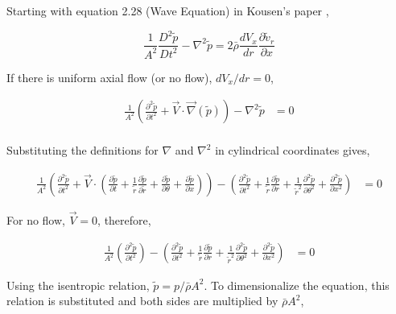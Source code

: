 \documentclass[a4paper]{article}
\begin{document}
Starting with equation 2.28 (Wave Equation) in Kousen's paper \cite{Kousen1999},



\begin{equation}
    \frac{1}{A^2}\frac{D^2\tilde{p}}{Dt^2} -
    \nabla^2 \tilde{p} =
    2 \bar{\rho} \frac{d V_x}{d r} \frac{\partial  \tilde{v}_r}{ \partial x} 
    \label{eqn:KousensWaveEquation}
\end{equation}

If there is uniform axial flow (or no flow), $dV_x/dr = 0$,

\begin{align*}
    \frac{1}{A^2}\left(
        \frac{\partial^2 \tilde{p}}{\partial t^2} + 
        \vec{V}\cdot \vec {\nabla} (\tilde{p}) 
    \right) -
    \nabla^2
    \tilde{p} &=
    0 \\
\end{align*}

Substituting the definitions for $\nabla$ and $\nabla^2$ in cylindrical 
coordinates gives,

\begin{align*} 
    \frac{1}{A^2}\left(
        \frac{\partial^2 \tilde{p}}{\partial t^2}
    + 
        \vec{V}\cdot \left(
            \frac{\partial\tilde{p}}{\partial t} + 
            \frac{1}{\tilde{r}}\frac{\partial \tilde{p} }{\partial \tilde{r}} +
            \frac{\partial \tilde{p}}{\partial \theta} +
            \frac{\partial \tilde{p}}{\partial x}  
        \right)  \right)-
        \left(
            \frac{\partial^2 \tilde{p}}{\partial t^2} + 
            \frac{1}{\tilde{r}}\frac{\partial \tilde{p}}{\partial r} +
            \frac{1}{\tilde{r}^2} \frac{\partial^2 \tilde{p}}{\partial \theta^2} + 
            \frac{\partial^2 \tilde{p}}{\partial x^2} 
        \right) &= 0  
\end{align*} 

For no flow, $\vec{V} = 0$, therefore,

\begin{align*} 
    \frac{1}{A^2}\left(
        \frac{\partial^2 \tilde{p}}{\partial t^2}
    \right) - 
        \left(
            \frac{\partial^2 \tilde{p}}{\partial t^2} + 
            \frac{1}{\tilde{r}}\frac{\partial \tilde{p}}{\partial  r}  +
            \frac{1}{\tilde{r}^2} \frac{\partial^2 \tilde{p}}{\partial \theta^2} + 
            \frac{\partial^2 \tilde{p}}{\partial x^2} 
        \right) &= 0  
\end{align*} 

Using the isentropic relation, $\tilde{p} = p/\bar{\rho} A^2$. 
To dimensionalize the equation, this relation is substituted and both sides 
are multiplied by $\bar{\rho}A^2$,
\end{document}
